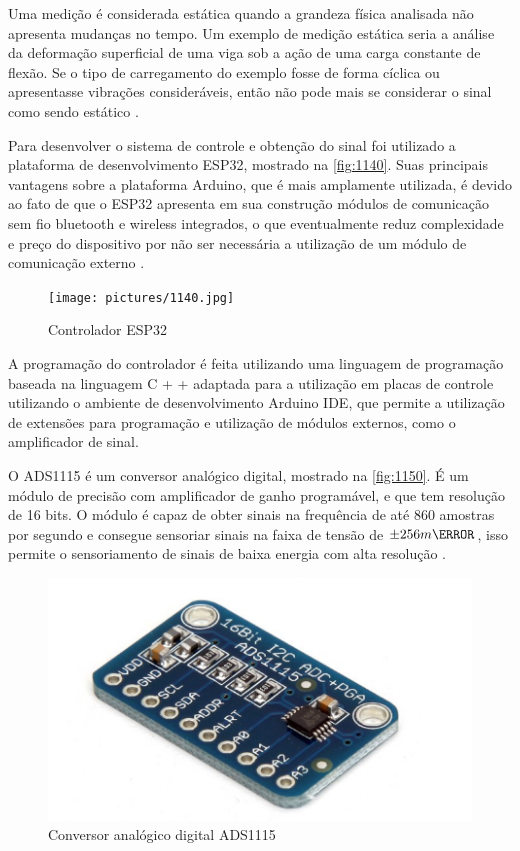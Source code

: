 Uma medição é considerada estática quando a grandeza física analisada não apresenta mudanças no tempo.
Um exemplo de medição estática seria a análise da deformação superficial de uma viga sob a ação de uma carga constante de flexão.
Se o tipo de carregamento do exemplo fosse de forma cíclica ou apresentasse vibrações consideráveis, então não pode mais se considerar o sinal como sendo estático \autocite{Hollman2011}.

Para desenvolver o sistema de controle e obtenção do sinal foi utilizado a plataforma de desenvolvimento ESP32, mostrado na \autoref{fig:1140}.
Suas principais vantagens sobre a plataforma Arduino, que é mais amplamente utilizada, é devido ao fato de que o ESP32 apresenta em sua construção módulos de comunicação sem fio bluetooth
e wireless integrados, o que eventualmente reduz complexidade e preço do dispositivo por não ser necessária a utilização de um módulo de comunicação externo \autocite{DocsESP32}.

\begin{figure}[htb]
	\caption{\label{fig:1140} Controlador ESP32}
	\begin{center}
		\texttt{[image: pictures/1140.jpg]}
	\end{center}
\end{figure}

A programação do controlador é feita utilizando uma linguagem de programação baseada na linguagem C + + adaptada para a utilização em placas de controle utilizando o ambiente
de desenvolvimento Arduino IDE, que permite a utilização de extensões para programação e utilização de módulos externos, como o amplificador de sinal.

O ADS1115 é um conversor analógico digital, mostrado na \autoref{fig:1150}.
É um módulo de precisão com amplificador de ganho programável, e que tem resolução de 16 bits.
O módulo é capaz de obter sinais na frequência de até 860 amostras por segundo e consegue sensoriar sinais na faixa de tensão de ${\pm 256}{m\V}$,
isso permite o sensoriamento de sinais de baixa energia com alta resolução \autocite{DocsADS115}.

\begin{figure}[htb]
	\caption{\label{fig:1150} Conversor analógico digital ADS1115}
	\begin{center}
		\includegraphics[width=\textwidth]{pictures/1150.png}
	\end{center}
\end{figure}

